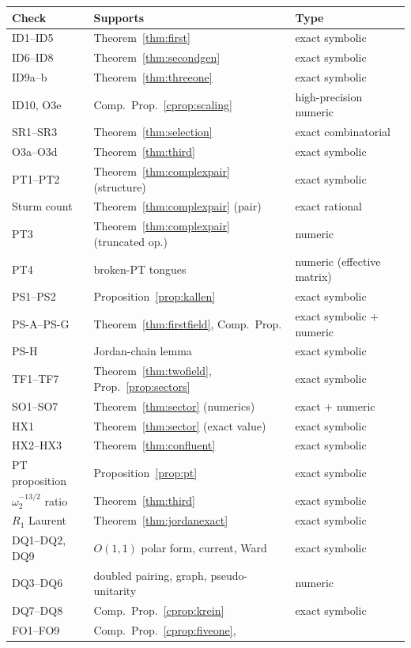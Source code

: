 \documentclass[11pt]{article}
\theoremstyle{definition}
\theoremstyle{remark}
\newcommand{\w}{\omega}
\begin{document}
\begin{center}
\small
\begin{tabular}{l l l}
\hline
Check & Supports & Type\\
\hline
ID1--ID5 & Theorem~\ref{thm:first} & exact symbolic\\
ID6--ID8 & Theorem~\ref{thm:secondgen} & exact symbolic\\
ID9a--b & Theorem~\ref{thm:threeone} & exact symbolic\\
ID10, O3e & Comp.\ Prop.~\ref{cprop:scaling} & high-precision numeric\\
SR1--SR3 & Theorem~\ref{thm:selection} & exact combinatorial\\
O3a--O3d & Theorem~\ref{thm:third} & exact symbolic\\
PT1--PT2 & Theorem~\ref{thm:complexpair} (structure) & exact symbolic\\
Sturm count & Theorem~\ref{thm:complexpair} (pair) &
exact rational\\
PT3 & Theorem~\ref{thm:complexpair} (truncated op.) & numeric\\
PT4 & broken-PT tongues & numeric (effective matrix)\\
PS1--PS2 & Proposition~\ref{prop:kallen} & exact symbolic\\
PS-A--PS-G & Theorem~\ref{thm:firstfield}, Comp.\ Prop. &
exact symbolic + numeric\\
PS-H & Jordan-chain lemma & exact symbolic\\
TF1--TF7 & Theorem~\ref{thm:twofield}, Prop.~\ref{prop:sectors} &
exact symbolic\\
SO1--SO7 & Theorem~\ref{thm:sector} (numerics) & exact + numeric\\
HX1 & Theorem~\ref{thm:sector} (exact value) & exact symbolic\\
HX2--HX3 & Theorem~\ref{thm:confluent} & exact symbolic\\
PT proposition & Proposition~\ref{prop:pt} & exact symbolic\\
$\w_2^{-13/2}$ ratio & Theorem~\ref{thm:third} & exact symbolic\\
$R_1$ Laurent & Theorem~\ref{thm:jordanexact} & exact symbolic\\
DQ1--DQ2, DQ9 & $O(1,1)$ polar form, current, Ward & exact symbolic\\
DQ3--DQ6 & doubled pairing, graph, pseudo-unitarity & numeric\\
DQ7--DQ8 & Comp.\ Prop.~\ref{cprop:krein} & exact symbolic\\
FO1--FO9 & Comp.\ Prop.~\ref{cprop:fiveone},

\end{tabular}
\end{center}
\end{document}
